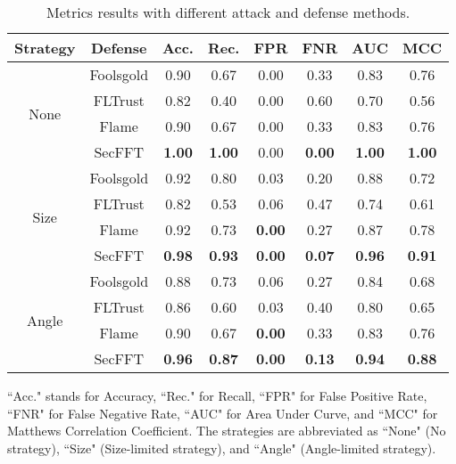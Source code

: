 \documentclass[lettersize,journal]{IEEEtran}
\begin{document}
\begin{table}[h!]
\small
\centering
\caption{Metrics results with different attack and defense methods.}
\begin{tabular}{c|c|c|c|c|c|c|c}
\hline
Strategy & Defense & Acc. & Rec. & FPR & FNR & AUC & MCC \\ \hline

\multirow{4}{*}{None} & Foolsgold & 0.90 & 0.67 & 0.00 & 0.33 & 0.83 & 0.76 \\
                      & FLTrust   & 0.82 & 0.40 & 0.00 & 0.60 & 0.70 & 0.56 \\
                      & Flame     & 0.90 & 0.67 & 0.00 & 0.33 & 0.83 & 0.76 \\
                      & SecFFT    & \textbf{1.00} & \textbf{1.00} & 0.00 & \textbf{0.00} & \textbf{1.00} & \textbf{1.00} \\ \hline

\multirow{4}{*}{Size} & Foolsgold & 0.92 & 0.80 & 0.03 & 0.20 & 0.88 & 0.72 \\ 
                      & FLTrust   & 0.82 & 0.53 & 0.06 & 0.47 & 0.74 & 0.61 \\ 
                      & Flame     & 0.92 & 0.73 & \textbf{0.00} & 0.27 & 0.87 & 0.78 \\ 
                      & SecFFT    & \textbf{0.98} & \textbf{0.93} & \textbf{0.00} & \textbf{0.07} & \textbf{0.96} & \textbf{0.91} \\ \hline

\multirow{4}{*}{Angle} & Foolsgold & 0.88 & 0.73 & 0.06 & 0.27 & 0.84 & 0.68 \\ 
                       & FLTrust   & 0.86 & 0.60 & 0.03 & 0.40 & 0.80 & 0.65 \\ 
                       & Flame     & 0.90 & 0.67 & \textbf{0.00} & 0.33 & 0.83 & 0.76 \\ 
                       & SecFFT    & \textbf{0.96} & \textbf{0.87} & \textbf{0.00} & \textbf{0.13} & \textbf{0.94} & \textbf{0.88} \\ \hline
\end{tabular}
\vspace{1em}
\begin{tablenotes}
\scriptsize
\item ``Acc." stands for Accuracy, ``Rec." for Recall, ``FPR" for False Positive Rate, ``FNR" for False Negative Rate, ``AUC" for Area Under Curve, and ``MCC" for Matthews Correlation Coefficient. The strategies are abbreviated as ``None" (No strategy), ``Size" (Size-limited strategy), and ``Angle" (Angle-limited strategy).
\end{tablenotes}

\label{tab:detect}
\end{table}
\end{document}
